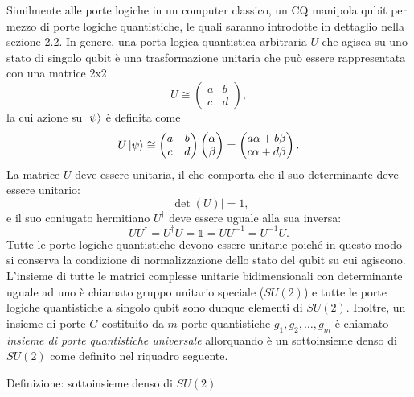 Similmente alle porte logiche in un computer classico, un \ac{CQ} manipola qubit per mezzo di porte 
logiche quantistiche, le quali saranno introdotte in dettaglio nella sezione 2.2. In genere, 
una porta logica quantistica arbitraria $U$ che agisca su uno stato di singolo qubit è una 
trasformazione unitaria che può essere rappresentata con una matrice 2x2
\begin{equation} \label{eq:2.14}
    U \cong 
    \begin{pmatrix}
        a & b \\ c & d
    \end{pmatrix},
\end{equation}
la cui azione su $\ket{\psi}$ è definita come 
\begin{equation}
    U\ket{\psi} \cong \begin{pmatrix}
        a&b\\c&d
    \end{pmatrix}\begin{pmatrix}
        \alpha\\\beta
    \end{pmatrix} = \begin{pmatrix}
        a\alpha + b\beta \\ c\alpha + d\beta
    \end{pmatrix}.
\end{equation}
La matrice $U$ deve essere unitaria, il che comporta che il suo determinante deve essere unitario: 
\begin{equation}
    |\det(U)|=1,
\end{equation}
e il suo coniugato hermitiano $U^\dagger$ deve essere uguale alla sua inversa: 
\begin{equation}
    UU^\dagger = U^\dagger U = \mathbb{1} = UU^{-1} = U^{-1}U.
\end{equation}
Tutte le porte logiche quantistiche devono essere unitarie poiché in questo modo si conserva 
la condizione di normalizzazione dello stato del qubit su cui agiscono. L'insieme di tutte 
le matrici complesse unitarie bidimensionali con determinante uguale ad uno è chiamato gruppo 
unitario speciale ($SU(2)$) e tutte le porte logiche quantistiche a singolo qubit sono dunque 
elementi di $SU(2)$. Inoltre, un insieme di porte $G$ costituito da $m$ porte quantistiche 
$g_1, g_2, \ldots, g_m$ è chiamato \emph{insieme di porte quantistiche universale} allorquando 
è un sottoinsieme denso di $SU(2)$ come definito nel riquadro seguente.

Definizione: sottoinsieme denso di $SU(2)$

